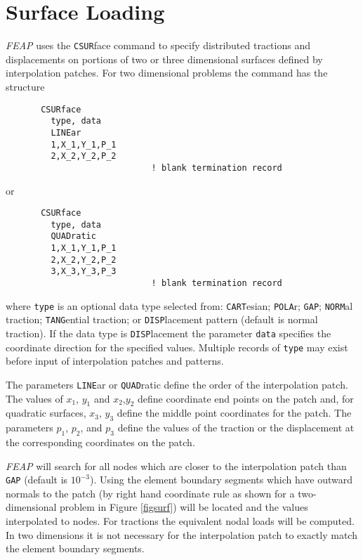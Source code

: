 \section{Surface Loading}
\label{surf}

{\sl FEAP} uses the {\tt CSUR}face command to specify distributed tractions
and displacements on portions of two or three dimensional
surfaces defined by interpolation patches.
For two dimensional problems the command has the structure
\begin{verbatim}
       CSURface
         type, data
         LINEar
         1,X_1,Y_1,P_1
         2,X_2,Y_2,P_2
                             ! blank termination record
\end{verbatim}
or
\begin{verbatim}
       CSURface
         type, data
         QUADratic
         1,X_1,Y_1,P_1
         2,X_2,Y_2,P_2
         3,X_3,Y_3,P_3
                             ! blank termination record
\end{verbatim}
where {\tt type} is an optional data type selected from:
{\tt CART}esian; {\tt POLA}r; {\tt GAP};
{\tt NORM}al traction;
{\tt TANG}ential traction; or {\tt DISP}lacement pattern (default is normal
traction).
If the data type is {\tt DISP}lacement the parameter {\tt data} specifies
the coordinate direction for the specified values.
Multiple records of {\tt type} may exist before input of interpolation
patches and patterns.

The parameters {\tt LINE}ar or {\tt QUAD}ratic define the order of the
interpolation patch.  The values of $x_1$, $y_1$ and $x_2$,$y_2$ define
coordinate end points on the patch and,
for quadratic surfaces, $x_3$, $y_3$ define
the middle point coordinates for the patch.
The parameters $p_1$, $p_2$, and $p_3$ define the values of the traction
or the displacement at the corresponding coordinates on the patch.

{\sl FEAP} will search for all nodes which are closer to the interpolation
patch than {\tt GAP} (default is $10^{-3}$).  Using the element boundary
segments which have outward normals to the patch (by right hand coordinate
rule as shown for a two-dimensional problem in Figure \ref{figsurf})
will be located and the values interpolated to nodes.  For tractions
the equivalent nodal loads will be computed.  In two dimensions it is
not necessary for the interpolation patch to exactly match the element
boundary segments.

